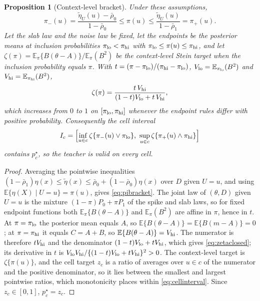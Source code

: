 \documentclass[11pt]{article}
\theoremstyle{plain}
\newtheorem{proposition}{Proposition}
\theoremstyle{definition}
\theoremstyle{remark}
\newcommand{\E}{\mathbb E}
\begin{document}
\begin{proposition}[Context-level bracket]\label{prop:ctxbracket}
Under these assumptions,
\begin{equation}\label{eq:pibracket}
\pi_-(u)=\frac{\widetilde\eta_U(u)-\bar\rho_0}{1-\bar\rho_0}\le\pi(u)\le
\frac{\widetilde\eta_U(u)}{1-\bar\rho_1}=\pi_+(u).
\end{equation}
Let the slab law and the noise law be fixed, let the endpoints be the posterior means at
inclusion probabilities $\pi_{\rm lo}<\pi_{\rm hi}$ with $\pi_{\rm lo}\le\pi(u)\le\pi_{\rm hi}$,
and let $\zeta(\pi)=\E_\pi\{B(\theta-A)\}/\E_\pi(B^2)$ be the context-level Stein target when the
inclusion probability equals $\pi$. With $t=(\pi-\pi_{\rm lo})/(\pi_{\rm hi}-\pi_{\rm lo})$,
$V_{\rm lo}=\E_{\pi_{\rm lo}}(B^2)$ and $V_{\rm hi}=\E_{\pi_{\rm hi}}(B^2)$,
\begin{equation}\label{eq:zetaclosed}
\zeta(\pi)=\frac{t\,V_{\rm hi}}{(1-t)V_{\rm lo}+t\,V_{\rm hi}},
\end{equation}
which increases from $0$ to $1$ on $[\pi_{\rm lo},\pi_{\rm hi}]$ whenever the endpoint rules
differ with positive probability. Consequently the cell interval
\begin{equation}\label{eq:cellinterval}
I_c=\Bigl[\inf_{u\in c}\zeta\{\pi_-(u)\vee\pi_{\rm lo}\},\
\sup_{u\in c}\zeta\{\pi_+(u)\wedge\pi_{\rm hi}\}\Bigr]
\end{equation}
contains $p^\star_c$, so the teacher is valid on every cell.
\end{proposition}

\begin{proof}
Averaging the pointwise inequalities $(1-\bar\rho_1)\eta(x)\le\widetilde\eta(x)\le
\bar\rho_0+(1-\bar\rho_0)\eta(x)$ over $D$ given $U=u$, and using
$\E\{\eta(X)\mid U=u\}=\pi(u)$, gives \eqref{eq:pibracket}. The joint law of $(\theta,D)$ given
$U=u$ is the mixture $(1-\pi)P_0+\pi P_1$ of the spike and slab laws, so for fixed endpoint
functions both $\E_\pi\{B(\theta-A)\}$ and $\E_\pi(B^2)$ are affine in $\pi$, hence in $t$. At
$\pi=\pi_{\rm lo}$ the posterior mean equals $A$, so $\E\{B(\theta-A)\}=\E\{B(m-A)\}=0$; at
$\pi=\pi_{\rm hi}$ it equals $C=A+B$, so $\E\{B(\theta-A)\}=V_{\rm hi}$. The numerator is
therefore $tV_{\rm hi}$ and the denominator $(1-t)V_{\rm lo}+tV_{\rm hi}$, which gives
\eqref{eq:zetaclosed}; its derivative in $t$ is $V_{\rm lo}V_{\rm hi}/\{(1-t)V_{\rm lo}+tV_{\rm
hi}\}^2>0$. The context-level target is $\zeta\{\pi(u)\}$, and the cell target $z_c$ is a ratio
of averages over $u\in c$ of the numerator and the positive denominator, so it lies between the
smallest and largest pointwise ratios, which monotonicity places within \eqref{eq:cellinterval}.
Since $z_c\in[0,1]$, $p^\star_c=z_c$.
\end{proof}
\end{document}
